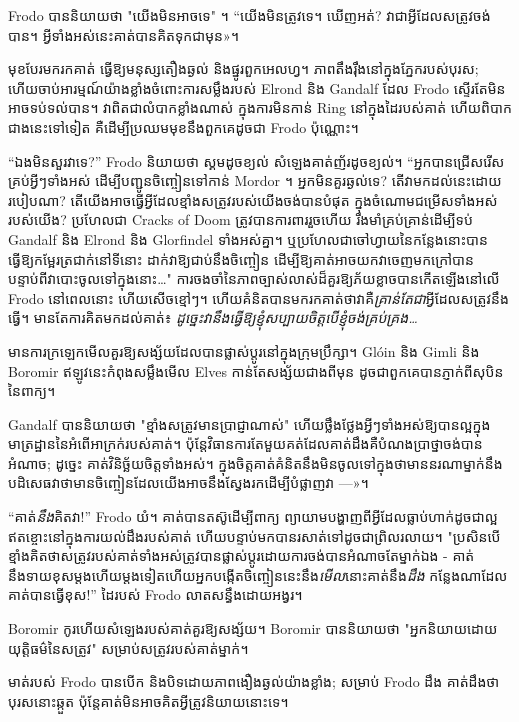 Frodo បាននិយាយថា "យើងមិនអាចទេ" ។ “យើងមិនត្រូវទេ។ ឃើញអត់? វាជាអ្វីដែលសត្រូវចង់បាន។ អ្វី​ទាំង​អស់​នេះ​គាត់​បាន​គិត​ទុក​ជា​មុន»។

មុខបែរមករកគាត់ ធ្វើឱ្យមនុស្សតឿងឆ្ងល់ និងផ្នូរពួកអេលហ្វ។ ភាពតឹងរ៉ឹងនៅក្នុងភ្នែករបស់បុរស; ហើយចាប់អារម្មណ៍យ៉ាងខ្លាំងចំពោះការសម្លឹងរបស់ Elrond និង Gandalf ដែល Frodo ស្ទើរតែមិនអាចទប់ទល់បាន។ វាពិតជាលំបាកខ្លាំងណាស់ ក្នុងការមិនកាន់ Ring នៅក្នុងដៃរបស់គាត់ ហើយពិបាកជាងនេះទៅទៀត គឺដើម្បីប្រឈមមុខនឹងពួកគេដូចជា Frodo ប៉ុណ្ណោះ។

“ឯងមិនសួរវាទេ?” Frodo និយាយ​ថា ស្គម​ដូច​ខ្យល់ សំឡេង​គាត់​ញ័រ​ដូច​ខ្យល់។ “អ្នកបានជ្រើសរើសគ្រប់អ្វីៗទាំងអស់ ដើម្បីបញ្ជូនចិញ្ចៀនទៅកាន់ Mordor ។ អ្នកមិនគួរឆ្ងល់ទេ? តើ​វា​មក​ដល់​នេះ​ដោយ​របៀប​ណា? តើយើងអាចធ្វើអ្វីដែលខ្មាំងសត្រូវរបស់យើងចង់បានបំផុត ក្នុងចំណោមជម្រើសទាំងអស់របស់យើង? ប្រហែលជា Cracks of Doom ត្រូវបានការពាររួចហើយ រឹងមាំគ្រប់គ្រាន់ដើម្បីទប់ Gandalf និង Elrond និង Glorfindel ទាំងអស់គ្នា។ ឬប្រហែលជាចៅហ្វាយនៃកន្លែងនោះបានធ្វើឱ្យកម្អែរត្រជាក់នៅទីនោះ ដាក់វាឱ្យជាប់នឹងចិញ្ចៀន ដើម្បីឱ្យគាត់អាចយកវាចេញមកក្រៅបាន បន្ទាប់ពីវាបោះចូលទៅក្នុងនោះ…" ការចងចាំនៃភាពច្បាស់លាស់ដ៏គួរឱ្យភ័យខ្លាចបានកើតឡើងនៅលើ Frodo នៅពេលនោះ ហើយសើចខ្មៅៗ។ ហើយគំនិតបានមករកគាត់ថាវាគឺ\emph{គ្រាន់តែជា}អ្វីដែលសត្រូវនឹងធ្វើ។ មាន​តែ​ការ​គិត​មក​ដល់​គាត់៖ \emph{ដូច្នេះ​វា​នឹង​ធ្វើ​ឱ្យ​ខ្ញុំ​សប្បាយ​ចិត្ត​បើ​ខ្ញុំ​ចង់​គ្រប់​គ្រង…}

មានការក្រឡេកមើលគួរឱ្យសង្ស័យដែលបានផ្លាស់ប្តូរនៅក្នុងក្រុមប្រឹក្សា។ Glóin និង Gimli និង Boromir ឥឡូវនេះកំពុងសម្លឹងមើល Elves កាន់តែសង្ស័យជាងពីមុន ដូចជាពួកគេបានភ្ញាក់ពីសុបិននៃពាក្យ។

Gandalf បាននិយាយថា "ខ្មាំងសត្រូវមានប្រាជ្ញាណាស់" ហើយថ្លឹងថ្លែងអ្វីៗទាំងអស់ឱ្យបានល្អក្នុងមាត្រដ្ឋាននៃអំពើអាក្រក់របស់គាត់។ ប៉ុន្តែវិធានការតែមួយគត់ដែលគាត់ដឹងគឺបំណងប្រាថ្នាចង់បានអំណាច; ដូច្នេះ គាត់​វិនិច្ឆ័យ​ចិត្ត​ទាំង​អស់។ ក្នុង​ចិត្ត​គាត់​គំនិត​នឹង​មិន​ចូល​ទៅ​ក្នុង​ថា​មាន​នរណា​ម្នាក់​នឹង​បដិសេធ​វា​ថា​មាន​ចិញ្ចៀន​ដែល​យើង​អាច​នឹង​ស្វែង​រក​ដើម្បី​បំផ្លាញ​វា —»។

“គាត់\emph{នឹង}គិតវា!” Frodo យំ។ គាត់បានតស៊ូដើម្បីពាក្យ ព្យាយាមបង្ហាញពីអ្វីដែលធ្លាប់ហាក់ដូចជាល្អឥតខ្ចោះនៅក្នុងការយល់ដឹងរបស់គាត់ ហើយបន្ទាប់មកបានរសាត់ទៅដូចជាព្រិលរលាយ។ "ប្រសិនបើខ្មាំងគិតថាសត្រូវរបស់គាត់ទាំងអស់ត្រូវបានផ្លាស់ប្តូរដោយការចង់បានអំណាចតែម្នាក់ឯង - គាត់នឹងទាយខុសម្តងហើយម្តងទៀតហើយអ្នកបង្កើតចិញ្ចៀននេះនឹង\emph{មើល}នោះគាត់នឹង\emph{ដឹង} កន្លែងណាដែលគាត់បានធ្វើខុស!” ដៃរបស់ Frodo លាតសន្ធឹងដោយអង្វរ។

Boromir កូរហើយសំឡេងរបស់គាត់គួរឱ្យសង្ស័យ។ Boromir បាននិយាយថា "អ្នកនិយាយដោយយុត្តិធម៌នៃសត្រូវ" សម្រាប់សត្រូវរបស់គាត់ម្នាក់។

មាត់របស់ Frodo បានបើក និងបិទដោយភាពងឿងឆ្ងល់យ៉ាងខ្លាំង; សម្រាប់ Frodo ដឹង គាត់ដឹងថាបុរសនោះឆ្កួត ប៉ុន្តែគាត់មិនអាចគិតអ្វីត្រូវនិយាយនោះទេ។

